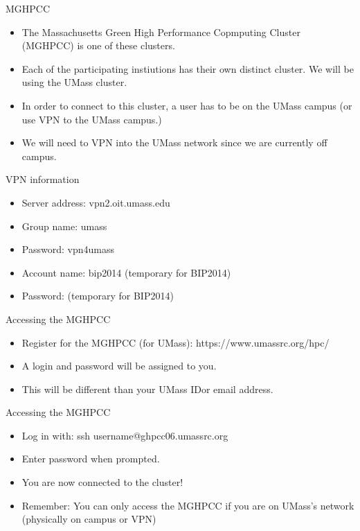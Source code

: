 \begin{frame}{MGHPCC}
\begin{itemize}
\item The Massachusetts Green High Performance Copmputing Cluster (MGHPCC) is one of these clusters.  
\item Each of the participating instiutions has their own distinct cluster. We will be using the UMass cluster.
\item In order to connect to this cluster, a user has to be on the UMass campus (or use VPN to the UMass campus.)
\item We will need to VPN into the UMass network since we are currently off campus.  
\end{itemize}
\end{frame}

\begin{frame}{VPN information}
\begin{itemize}
\item Server address: vpn2.oit.umass.edu 
\item Group name: umass
\item Password: vpn4umass
\item Account name: bip2014 (temporary for BIP2014)
\item Password:  (temporary for BIP2014)
\end{itemize}
\end{frame}

\begin{frame}{Accessing the MGHPCC}
\begin{itemize}
\item Register for the MGHPCC (for UMass): https://www.umassrc.org/hpc/
\item A login and password will be assigned to you. 
\item This will be different than your UMass IDor email address.
\end{itemize}
\end{frame}


\begin{frame}{Accessing the MGHPCC}
\begin{itemize}
\item Log in with: ssh username@ghpcc06.umassrc.org
\item Enter password when prompted.  
\item You are now connected to the cluster!
\item Remember: You can only access the MGHPCC if you are on UMass's network (physically on campus or VPN)
\end{itemize}
\end{frame}

